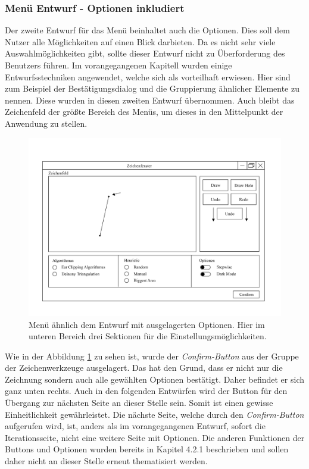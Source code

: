 \subsubsection{Menü Entwurf - Optionen inkludiert}
Der zweite Entwurf für das Menü beinhaltet auch die Optionen. Dies soll dem Nutzer alle Möglichkeiten auf einen Blick darbieten. Da es nicht sehr viele Auswahlmöglichkeiten gibt, sollte dieser Entwurf nicht zu Überforderung
des Benutzers führen. Im vorangegangenen Kapitell wurden einige Entwurfsstechniken angewendet, welche sich als vorteilhaft erwiesen. Hier sind zum Beispiel der Bestätigungsdialog und die Gruppierung ähnlicher Elemente zu nennen.
Diese wurden in diesen zweiten Entwurf übernommen. Auch bleibt das Zeichenfeld der größte Bereich des Menüs, um dieses in den Mittelpunkt der Anwendung zu stellen.

\begin{figure}[h]
    \includegraphics[width=1\textwidth]{bilder/menu_mit_optionen.png}
    \caption[Entwurf für das Menü mit Optionen]{Menü ähnlich dem Entwurf mit ausgelagerten Optionen. Hier im unteren Bereich drei Sektionen für die Einstellungsmöglichkeiten.}
    \label{fig:menu_mit_optionen}
\end{figure}

Wie in der Abbildung \ref{fig:menu_mit_optionen} zu sehen ist, wurde der \emph{Confirm-Button} aus der Gruppe der Zeichenwerkzeuge ausgelagert. Das hat den Grund, dass er nicht nur die Zeichnung sondern auch alle gewählten Optionen bestätigt.
Daher befindet er sich ganz unten rechts. Auch in den folgenden Entwürfen wird der Button für den Übergang zur nächsten Seite an dieser Stelle sein. Somit ist einen gewisse Einheitlichkeit gewährleistet.
Die nächste Seite, welche durch den \emph{Confirm-Button} aufgerufen wird, ist, anders als im vorangegangenen Entwurf, sofort die Iterationsseite, nicht eine weitere Seite mit Optionen.
Die anderen Funktionen der Buttons und Optionen wurden bereits in Kapitel 4.2.1 beschrieben und sollen daher nicht an dieser Stelle erneut thematisiert werden.

